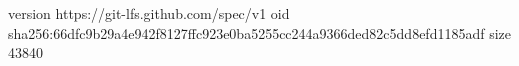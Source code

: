 version https://git-lfs.github.com/spec/v1
oid sha256:66dfc9b29a4e942f8127ffc923e0ba5255cc244a9366ded82c5dd8efd1185adf
size 43840

